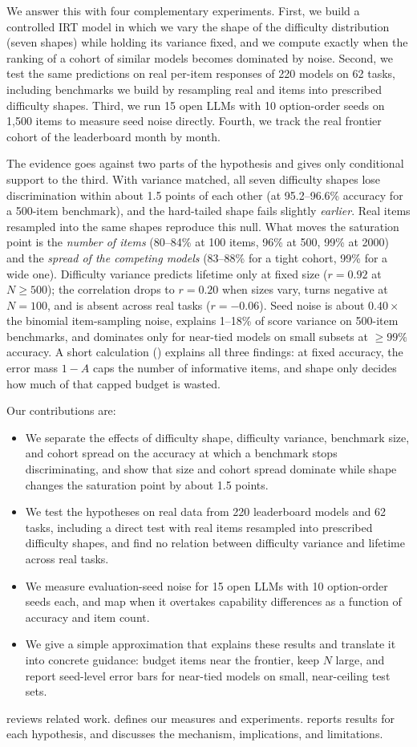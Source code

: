 We answer this with four complementary experiments. First, we build a controlled IRT model in which we vary the shape of the difficulty distribution (seven shapes) while holding its variance fixed, and we compute exactly when the ranking of a cohort of similar models becomes dominated by noise. Second, we test the same predictions on real per-item responses of 220 \leaderboard models on 62 tasks, including benchmarks we build by resampling real \mmlu and \hellaswag items into prescribed difficulty shapes. Third, we run 15 open LLMs with 10 option-order seeds on 1{,}500 items to measure seed noise directly. Fourth, we track the real frontier cohort of the leaderboard month by month.

The evidence goes against two parts of the hypothesis and gives only conditional support to the third. With variance matched, all seven difficulty shapes lose discrimination within about 1.5 points of each other (at 95.2--96.6\% accuracy for a 500-item benchmark), and the hard-tailed shape fails slightly {\em earlier}. Real items resampled into the same shapes reproduce this null. What moves the saturation point is the {\em number of items} (80--84\% at 100 items, 96\% at 500, 99\% at 2000) and the {\em spread of the competing models} (83--88\% for a tight cohort, 99\% for a wide one). Difficulty variance predicts lifetime only at fixed size ($r = 0.92$ at $N \ge 500$); the correlation drops to $r = 0.20$ when sizes vary, turns negative at $N = 100$, and is absent across real tasks ($r = -0.06$). Seed noise is about $0.40\times$ the binomial item-sampling noise, explains 1--18\% of score variance on 500-item benchmarks, and dominates only for near-tied models on small subsets at $\ge 99\%$ accuracy. A short calculation () explains all three findings: at fixed accuracy, the error mass $1 - A$ caps the number of informative items, and shape only decides how much of that capped budget is wasted.

Our contributions are:
\begin{itemize}[leftmargin=*,itemsep=0pt,topsep=0pt]
    \item We separate the effects of difficulty shape, difficulty variance, benchmark size, and cohort spread on the accuracy at which a benchmark stops discriminating, and show that size and cohort spread dominate while shape changes the saturation point by about 1.5 points.
    \item We test the hypotheses on real data from 220 leaderboard models and 62 tasks, including a direct test with real items resampled into prescribed difficulty shapes, and find no relation between difficulty variance and lifetime across real tasks.
    \item We measure evaluation-seed noise for 15 open LLMs with 10 option-order seeds each, and map when it overtakes capability differences as a function of accuracy and item count.
    \item We give a simple approximation that explains these results and translate it into concrete guidance: budget items near the frontier, keep $N$ large, and report seed-level error bars for near-tied models on small, near-ceiling test sets.
\end{itemize}

 reviews related work.  defines our measures and experiments.  reports results for each hypothesis, and  discusses the mechanism, implications, and limitations.
